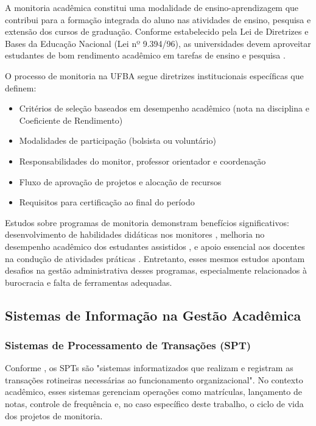 \documentclass[portuguese]{sbc2025}%
\begin{document}
A monitoria acadêmica constitui uma modalidade de ensino-aprendizagem que contribui para a formação integrada do aluno nas atividades de ensino, pesquisa e extensão dos cursos de graduação. Conforme estabelecido pela Lei de Diretrizes e Bases da Educação Nacional (Lei nº 9.394/96), as universidades devem aproveitar estudantes de bom rendimento acadêmico em tarefas de ensino e pesquisa \cite{Brasil1996}.

O processo de monitoria na UFBA segue diretrizes institucionais específicas que definem:
\begin{itemize}
  \item Critérios de seleção baseados em desempenho acadêmico (nota na disciplina e Coeficiente de Rendimento)
  \item Modalidades de participação (bolsista ou voluntário)
  \item Responsabilidades do monitor, professor orientador e coordenação
  \item Fluxo de aprovação de projetos e alocação de recursos
  \item Requisitos para certificação ao final do período
\end{itemize}

Estudos sobre programas de monitoria demonstram benefícios significativos: desenvolvimento de habilidades didáticas nos monitores \cite{Natario2010}, melhoria no desempenho acadêmico dos estudantes assistidos \cite{Frison2016}, e apoio essencial aos docentes na condução de atividades práticas \cite{Dantas2014}. Entretanto, esses mesmos estudos apontam desafios na gestão administrativa desses programas, especialmente relacionados à burocracia e falta de ferramentas adequadas.

\subsection{Sistemas de Informação na Gestão Acadêmica}

\subsubsection{Sistemas de Processamento de Transações (SPT)}

Conforme \cite{Laudon_Laudon_2011}, os SPTs são "sistemas informatizados que realizam e registram as transações rotineiras necessárias ao funcionamento organizacional". No contexto acadêmico, esses sistemas gerenciam operações como matrículas, lançamento de notas, controle de frequência e, no caso específico deste trabalho, o ciclo de vida dos projetos de monitoria.
\end{document}
